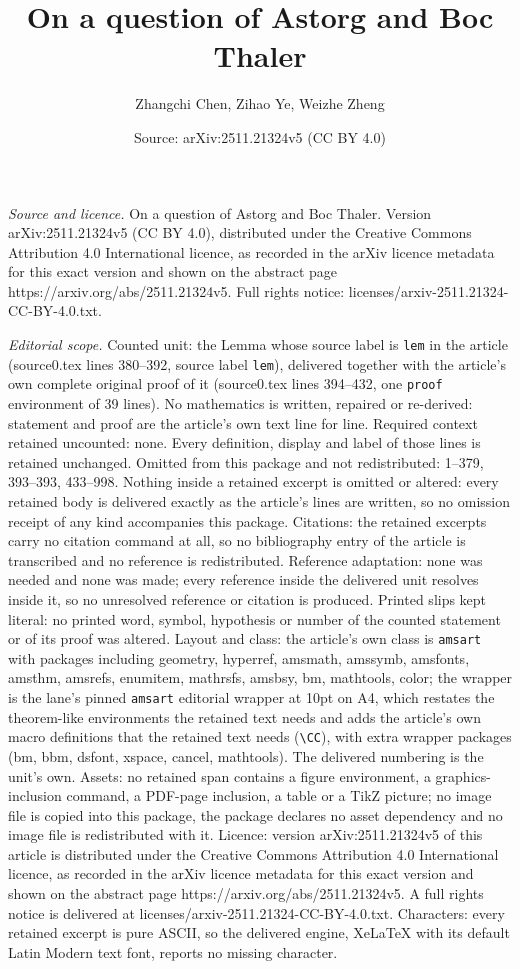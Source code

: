 \documentclass[10pt,a4paper]{amsart}
\title[On a question of Astorg and Boc Thaler]{On a question of Astorg and Boc Thaler}
\author{Zhangchi Chen, Zihao Ye, Weizhe Zheng}
\date{Source: arXiv:2511.21324v5 (CC BY 4.0)}
\begin{document}
\maketitle

\noindent\emph{Source and licence.} On a question of Astorg and Boc Thaler. Version arXiv:2511.21324v5 (CC BY 4.0), distributed under the Creative Commons Attribution 4.0 International licence, as recorded in the arXiv licence metadata for this exact version and shown on the abstract page https://arxiv.org/abs/2511.21324v5. Full rights notice: licenses/arxiv-2511.21324-CC-BY-4.0.txt.\par\smallskip

\noindent\textit{Editorial scope.} Counted unit: the Lemma whose source label is \texttt{lem} in the article (source0.tex lines 380--392, source label \texttt{lem}), delivered together with the article's own complete original proof of it (source0.tex lines 394--432, one \texttt{proof} environment of 39 lines). No mathematics is written, repaired or re-derived: statement and proof are the article's own text line for line. Required context retained uncounted: none. Every definition, display and label of those lines is retained unchanged. Omitted from this package and not redistributed: 1--379, 393--393, 433--998. Nothing inside a retained excerpt is omitted or altered: every retained body is delivered exactly as the article's lines are written, so no omission receipt of any kind accompanies this package. Citations: the retained excerpts carry no citation command at all, so no bibliography entry of the article is transcribed and no reference is redistributed. Reference adaptation: none was needed and none was made; every reference inside the delivered unit resolves inside it, so no unresolved reference or citation is produced. Printed slips kept literal: no printed word, symbol, hypothesis or number of the counted statement or of its proof was altered. Layout and class: the article's own class is \texttt{amsart} with packages including geometry, hyperref, amsmath, amssymb, amsfonts, amsthm, amsrefs, enumitem, mathrsfs, amsbsy, bm, mathtools, color; the wrapper is the lane's pinned \texttt{amsart} editorial wrapper at 10pt on A4, which restates the theorem-like environments the retained text needs and adds the article's own macro definitions that the retained text needs (\texttt{\textbackslash CC}), with extra wrapper packages (bm, bbm, dsfont, xspace, cancel, mathtools). The delivered numbering is the unit's own. Assets: no retained span contains a figure environment, a graphics-inclusion command, a PDF-page inclusion, a table or a TikZ picture; no image file is copied into this package, the package declares no asset dependency and no image file is redistributed with it. Licence: version arXiv:2511.21324v5 of this article is distributed under the Creative Commons Attribution 4.0 International licence, as recorded in the arXiv licence metadata for this exact version and shown on the abstract page https://arxiv.org/abs/2511.21324v5. A full rights notice is delivered at licenses/arxiv-2511.21324-CC-BY-4.0.txt. Characters: every retained excerpt is pure ASCII, so the delivered engine, XeLaTeX with its default Latin Modern text font, reports no missing character.
\end{document}
